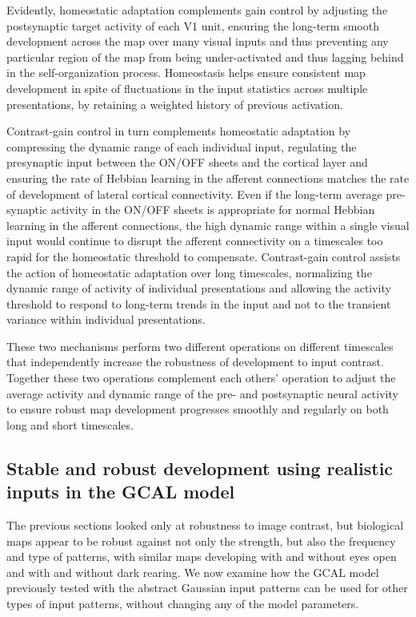 \documentclass{article}
\begin{document}
Evidently, homeostatic adaptation complements gain control by adjusting
the postsynaptic target activity of each V1 unit, ensuring the
long-term smooth development across the map over many visual inputs
and thus preventing any particular region of the map from being
under-activated and thus lagging behind in the self-organization
process. Homeostasis helps ensure consistent map development in spite
of fluctuations in the input statistics across multiple presentations,
by retaining a weighted history of previous activation.

Contrast-gain control in turn complements homeostatic adaptation by
compressing the dynamic range of each individual input, regulating the
presynaptic input between the ON/OFF sheets and the cortical layer and
ensuring the rate of Hebbian learning in the afferent connections
matches the rate of development of lateral cortical connectivity. Even
if the long-term average pre-synaptic activity in the ON/OFF sheets is
appropriate for normal Hebbian learning in the afferent connections,
the high dynamic range within a single visual input would continue to
disrupt the afferent connectivity on a timescales too rapid for the
homeostatic threshold to compensate. Contrast-gain control assists the
action of homeostatic adaptation over long timescales, normalizing the
dynamic range of activity of individual presentations and allowing the
activity threshold to respond to long-term trends in the input and not
to the transient variance within individual presentations.

These two mechanisms perform two different operations on different
timescales that independently increase the robustness of development to
input contrast. Together these two operations complement each others'
operation to adjust the average activity and dynamic range of the pre-
and postsynaptic neural activity to ensure robust map development
progresses smoothly and regularly on both long and short timescales.

\subsection*{Stable and robust development using realistic inputs in the GCAL model}

The previous sections looked only at robustness to image contrast, but
biological maps appear to be robust against not only the strength, but
also the frequency and type of patterns, with similar maps developing
with and without eyes open and with and without dark rearing.  We now
 examine how the GCAL model previously tested with the
abstract Gaussian input patterns can be used for other types of input
patterns, without changing any of the model parameters.
\end{document}
